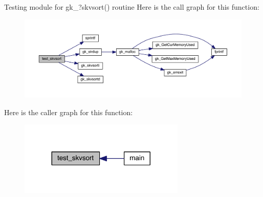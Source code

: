 Testing module for gk\+\_\+?skvsort() routine Here is the call graph for this function\+:\nopagebreak
\begin{figure}[H]
\begin{center}
\leavevmode
\includegraphics[width=350pt]{a00152_ae2471bde9a7e9419d330392c2e2b35fd_cgraph}
\end{center}
\end{figure}
Here is the caller graph for this function\+:\nopagebreak
\begin{figure}[H]
\begin{center}
\leavevmode
\includegraphics[width=224pt]{a00152_ae2471bde9a7e9419d330392c2e2b35fd_icgraph}
\end{center}
\end{figure}
